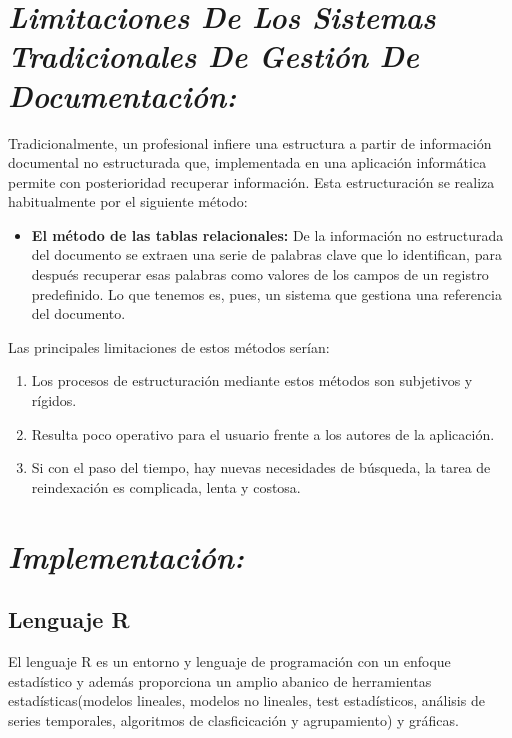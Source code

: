 \documentclass[journal]{IEEEtran}
\begin{document}
\section{\textbf{\emph{Limitaciones De Los Sistemas Tradicionales De Gestión De Documentación:}}}

Tradicionalmente, un profesional infiere una estructura a partir de información documental no estructurada que, implementada en una aplicación informática permite con posterioridad recuperar información. Esta estructuración se realiza habitualmente por el siguiente método:\\

\begin{itemize}
\item \textbf{El método de las tablas relacionales:} De la información no estructurada del documento se extraen una serie de palabras clave que lo identifican, para después recuperar esas palabras como valores de los campos de un registro predefinido. Lo que tenemos es, pues, un sistema que gestiona una referencia del documento.\\
\end{itemize}
    
Las principales limitaciones de estos métodos serían:
    
\begin{enumerate}
\item Los procesos de estructuración mediante estos métodos son subjetivos y rígidos.
        
\item Resulta poco operativo para el usuario frente a los autores de la aplicación.
        
\item Si con el paso del tiempo, hay nuevas necesidades de búsqueda, la tarea de reindexación es complicada, lenta y costosa.
\end{enumerate}

\section{\textbf{\emph{Implementación:}}}

\subsection{Lenguaje R}
El lenguaje R es un entorno y lenguaje de programación con un enfoque estadístico y además proporciona un amplio abanico de herramientas estadísticas(modelos lineales, modelos no lineales, test estadísticos, análisis de series temporales, algoritmos de clasficicación y agrupamiento) y gráficas.\\
\end{document}
